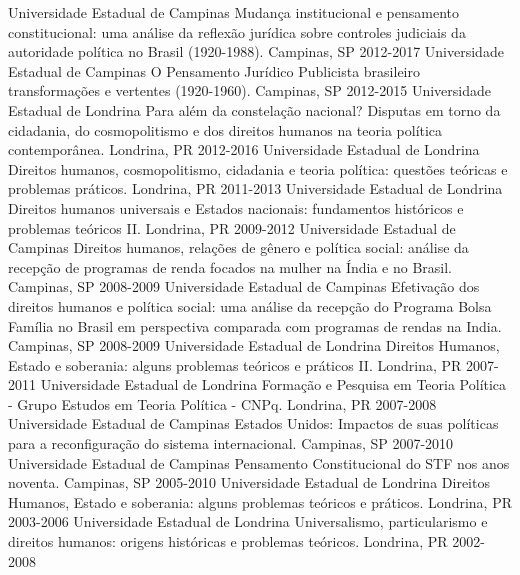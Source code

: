\begin{cvhonors}
  \cvhonor
    {Universidade Estadual de Campinas}
    {Mudança institucional e pensamento constitucional: uma análise da reflexão jurídica sobre controles judiciais da autoridade política no Brasil (1920-1988).}
    {Campinas, SP}
    {2012-2017}
  \cvhonor
    {Universidade Estadual de Campinas}
    {O Pensamento Jurídico Publicista brasileiro transformações e vertentes (1920-1960).}
    {Campinas, SP}
    {2012-2015}
  \cvhonor
    {Universidade Estadual de Londrina}
    {Para além da constelação nacional? Disputas em torno da cidadania, do cosmopolitismo e dos direitos humanos na teoria política contemporânea.}
    {Londrina, PR}
    {2012-2016}
  \cvhonor
    {Universidade Estadual de Londrina}
    {Direitos humanos, cosmopolitismo, cidadania e teoria política: questões teóricas e problemas práticos.}
    {Londrina, PR}
    {2011-2013}
  \cvhonor
    {Universidade Estadual de Londrina}
    {Direitos humanos universais e Estados nacionais: fundamentos históricos e problemas teóricos II.}
    {Londrina, PR}
    {2009-2012}
  \cvhonor
    {Universidade Estadual de Campinas}
    {Direitos humanos, relações de gênero e política social: análise da recepção de programas de renda focados na mulher na Índia e no Brasil.}
    {Campinas, SP}
    {2008-2009}
  \cvhonor
    {Universidade Estadual de Campinas}
    {Efetivação dos direitos humanos e política social: uma análise da recepção do Programa Bolsa Família no Brasil em perspectiva comparada com programas de rendas na India.}
    {Campinas, SP}
    {2008-2009}
  \cvhonor
    {Universidade Estadual de Londrina}
    {Direitos Humanos, Estado e soberania: alguns problemas teóricos e práticos II.}
    {Londrina, PR}
    {2007-2011}
  \cvhonor
    {Universidade Estadual de Londrina}
    {Formação e Pesquisa em Teoria Política - Grupo Estudos em Teoria Política - CNPq.}
    {Londrina, PR}
    {2007-2008}
  \cvhonor
    {Universidade Estadual de Campinas}
    {Estados Unidos: Impactos de suas políticas para a reconfiguração do sistema internacional.}
    {Campinas, SP}
    {2007-2010}
  \cvhonor
    {Universidade Estadual de Campinas}
    {Pensamento Constitucional do STF nos anos noventa.}
    {Campinas, SP}
    {2005-2010}
  \cvhonor
    {Universidade Estadual de Londrina}
    {Direitos Humanos, Estado e soberania: alguns problemas teóricos e práticos.}
    {Londrina, PR}
    {2003-2006}
  \cvhonor
    {Universidade Estadual de Londrina}
    {Universalismo, particularismo e direitos humanos: origens históricas e problemas teóricos.}
    {Londrina, PR}
    {2002-2008}
\end{cvhonors}
